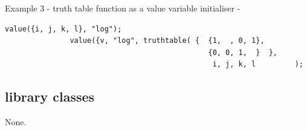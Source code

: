            Example 3 - truth table function as a value variable initialiser -
            \begin{lstlisting}[gobble=12, language=threepl]
               value({i, j, k, l}, "log");
               value({v, "log", truthtable( {  {1,  , 0, 1},
                                               {0, 0, 1,  }  },
                                                i, j, k, l         );
            \end{lstlisting}



    \subsection{library classes}
    
        None.
